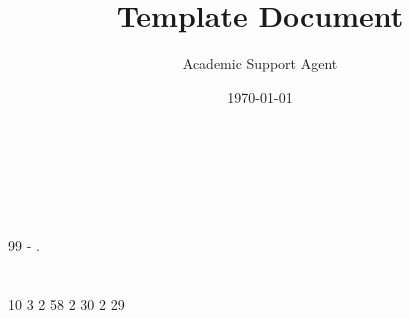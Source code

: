 \documentclass{article}
\title{Template Document}
\author{Academic Support Agent}
\date{\today}
\begin{document}
\maketitle


\section{ }

		 

	 

	 




\section{ }

\JSPSInstructions	%

\textbf{\\ \\
 \\
 }

	 

	\vspace{1cm}
	\begin{thebibliography}{99}
		   -  .
	\end{thebibliography}



\section{ }

	 10 3 2 58 
	 2 30 2 29 

\end{document}
